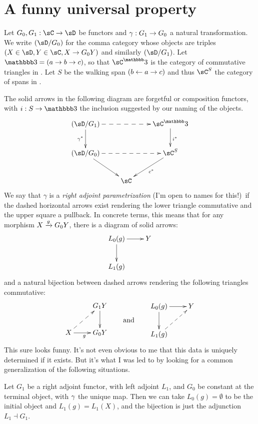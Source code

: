 \documentclass{amsart}
\begin{document}
\section{A funny universal property}
\label{sec:funny-univ-prop}

Let $G_0,G_1:\sC\to\sD$ be functors and $\gamma:G_1\to G_0$ a natural transformation.
We write $(\sD/G_0)$ for the comma category whose objects are triples $(X\in\sD, Y\in\sC, X\to G_0 Y)$ and similarly $(\sD/G_1)$.
Let $\bbthree = (a\to b \to c)$, so that $\sC^\bbthree$ is the category of commutative triangles in \sC.
Let $S$ be the walking span $(b \leftarrow a \to c)$ and thus $\sC^S$ the category of spans in \sC.

The solid arrows in the following diagram are forgetful or composition functors, with $i:S\to \bbthree$ the inclusion suggested by our naming of the objects.
\begin{equation}
  \vcenter{\xymatrix{
      (\sD/G_1) \ar@{-->}[rr]\ar[d]_{\gamma^*} &&
      \sC^\bbthree \ar[d]^{i^*}\\
      (\sD/G_0) \ar@{-->}[rr] \ar[dr] &&
      \sC^S \ar[dl]^{c^*}\\
      & \sC
      }}
\end{equation}
We say that $\gamma$ is a \emph{right adjoint parametrization} (I'm open to names for this!)\ if the dashed horizontal arrows exist rendering the lower triangle commutative and the upper square a pullback.
In concrete terms, this means that for any morphism $X\xrightarrow{g} G_0 Y$, there is a diagram of solid arrows:
\begin{equation}\label{eq:Lspan}
  \vcenter{\xymatrix{
      L_0(g)\ar[r]\ar[d] &
      Y\\
      L_1(g)
    }}
\end{equation}
and a natural bijection between dashed arrows rendering the following triangles commutative:
\begin{equation}\label{eq:Lbij}
  \vcenter{\xymatrix{
      &
      G_1 Y\ar[d]\\
      X\ar[r]_g\ar@{-->}[ur] &
      G_0 Y
      }}
    \qquad\text{and}\qquad
  \vcenter{\xymatrix{
      L_0(g)\ar[r]\ar[d] &
      Y\\
      L_1(g) \ar@{-->}[ur]
    }}
\end{equation}
This sure looks funny.
It's not even obvious to me that this data is uniquely determined if it exists.
But it's what I was led to by looking for a common generalization of the following situations.

\begin{eg}
  Let $G_1$ be a right adjoint functor, with left adjoint $L_1$, and $G_0$ be constant at the terminal object, with $\gamma$ the unique map.
  Then we can take $L_0(g)=\emptyset$ to be the initial object and $L_1(g) = L_1(X)$, and the bijection is just the adjunction $L_1\dashv G_1$.
\end{eg}
\end{document}
